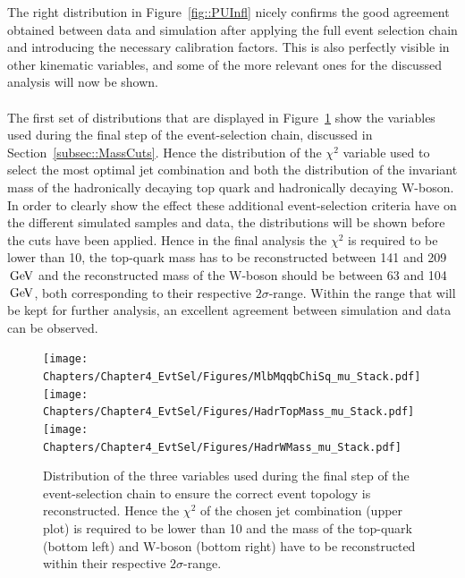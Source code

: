 The right distribution in Figure~\ref{fig::PUInfl} nicely confirms the good agreement obtained between data and simulation after applying the full event selection chain and introducing the necessary calibration factors. This is also perfectly visible in other kinematic variables, and some of the more relevant ones for the discussed analysis will now be shown.
\\
\\
The first set of distributions that are displayed in Figure~\ref{fig::MassCutsFigs} show the variables used during the final step of the event-selection chain, discussed in Section~\ref{subsec::MassCuts}.
Hence the distribution of the $\chi^{2}$ variable used to select the most optimal jet combination and both the distribution of the invariant mass of the hadronically decaying top quark and hadronically decaying W-boson.
In order to clearly show the effect these additional event-selection criteria have on the different simulated samples and data, the distributions will be shown before the cuts have been applied. Hence in the final analysis the $\chi^{2}$ is required to be lower than 10, the top-quark mass has to be reconstructed between 141 and 209$\, \mathrm{GeV}$ and the reconstructed mass of the W-boson should be between 63 and 104$\, \mathrm{GeV}$, both corresponding to their respective $2\sigma$-range.
Within the range that will be kept for further analysis, an excellent agreement between simulation and data can be observed.
\\
\begin{figure}[h!tp]
 \centering
 \texttt{[image: Chapters/Chapter4\_EvtSel/Figures/MlbMqqbChiSq\_mu\_Stack.pdf]} \vspace{0.3cm} \\
 \texttt{[image: Chapters/Chapter4\_EvtSel/Figures/HadrTopMass\_mu\_Stack.pdf]} \hspace{0.2cm}
 \texttt{[image: Chapters/Chapter4\_EvtSel/Figures/HadrWMass\_mu\_Stack.pdf]} 
 \caption{Distribution of the three variables used during the final step of the event-selection chain to ensure the correct event topology is reconstructed. Hence the $\chi^{2}$ of the chosen jet combination (upper plot) is required to be lower than 10 and the mass of the top-quark (bottom left) and W-boson (bottom right) have to be reconstructed within their respective $2\sigma$-range.} \label{fig::MassCutsFigs}
\end{figure}

